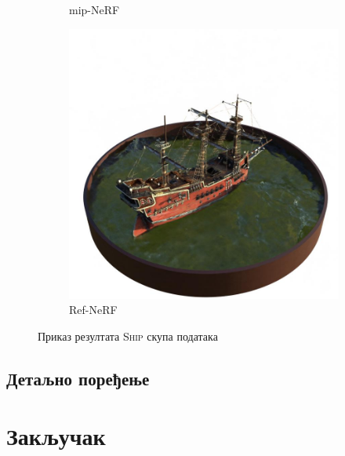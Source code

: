 \documentclass[12pt, a4paper, twoside]{book}
\numberwithin{equation}{chapter}
\numberwithin{theorem}{section}
\numberwithin{definition}{section}
\numberwithin{definitionChapter}{chapter}
\begin{document}
\begin{figure}[H]
\begin{subfigure}{0.3\textwidth}
			\caption{mip-NeRF}
		\end{subfigure}
		\hspace*{\fill}
		\begin{subfigure}{0.3\textwidth}
			\centering
			\includegraphics[scale=0.2]{img/refnerf/refnerf_ship_38.jpg}
			\caption{Ref-NeRF}
		\end{subfigure}
		\caption{Приказ резултата \textsc{Ship} скупа података}
		\label{fig-ship-results}
	\end{figure}

\section{Детаљно поређење}

\chapter{Закључак}



\end{document}
